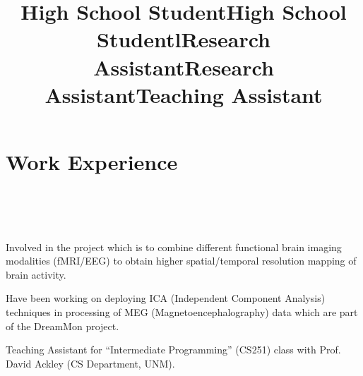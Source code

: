 \documentclass[10pt,overlapped,line]{res}
\begin{document}
\begin{resume}
\title{High School Student}
\begin{position}
\end{position}


\title{High School Student}
\begin{position}
\end{position}
 

\section{Work Experience}
\begin{format}
  \title{l}\\
  \\
  \body\\
\end{format}

\title{Research Assistant}
\begin{position}
  Involved in the project which is to combine different functional brain 
 imaging modalities (fMRI/EEG) to obtain higher spatial/temporal resolution 
 mapping of brain activity.
\end{position}

\title{Research Assistant}
\begin{position}
  Have been working  on deploying ICA (Independent Component
  Analysis) techniques in processing of MEG (Magnetoencephalography)
  data which are part of the DreamMon project.
  

\end{position}

\title{Teaching Assistant}
\begin{position}
  Teaching Assistant for ``Intermediate Programming'' (CS251) class
  with Prof. David Ackley (CS Department, UNM).
\end{position}



\end{resume}
\end{document}
